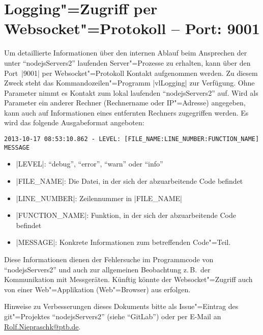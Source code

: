 \documentclass[%
fontsize=11pt
,paper=a4
,twoside
,headings=normal
,numbers=endperiod
,pagesize
]{scrartcl}
\begin{document}
\section{Logging"=Zugriff per Websocket"=Protokoll -- Port: 9001}

Um detaillierte Informationen über den internen Ablauf beim Ansprechen der
unter "`nodejsServers2"' laufenden Server"=Prozesse zu erhalten, kann über
den Port~|9001| per Websocket"=Protokoll Kontakt aufgenommen werden. Zu
diesem Zweck steht das Kommandozeilen"=Programm |vlLogging| zur Verfügung.
Ohne Parameter nimmt es Kontakt zum lokal laufenden "`nodejsServers2"' auf.
Wird als Parameter ein anderer Rechner (Rechnername oder IP"=Adresse)
angegeben, kann auch auf Informationen eines entfernten Rechners zugegriffen
werden. Es wird das folgende Ausgabeformat angeboten:
\begin{lstlisting}[language={}]
2013-10-17 08:53:10.862 - LEVEL: [FILE_NAME:LINE_NUMBER:FUNCTION_NAME] MESSAGE
\end{lstlisting}
\begin{itemize}
  \item |LEVEL|: "`debug"', "`error"', "`warn"' oder "`info"'
  \item |FILE_NAME|: Die Datei, in der sich der abzuarbeitende Code befindet
  \item |LINE_NUMBER|: Zeilennummer in |FILE_NAME|
  \item |FUNCTION_NAME|: Funktion, in der sich der abzuarbeitende Code befindet
  \item |MESSAGE|: Konkrete Informationen zum betreffenden Code"=Teil.
\end{itemize}
Diese Informationen dienen der Fehlersuche im Programmcode von
"`nodejsServers2"' und auch zur allgemeinen Beobachtung z.\,B.\ der
Kommunikation mit Messgeräten. Künftig könnte der Websocket"=Zugriff auch von
einer Web"=Applikation (Web"=Browser) aus erfolgen.

\vfill

\begingroup \small \itshape

\noindent Hinweise zu Verbesserungen dieses Dokuments bitte als
Issue"=Eintrag des git"=Projektes "`nodejsServers2"' (siehe "`GitLab"') oder per
E-Mail an \url{Rolf.Niepraschk@ptb.de}.

\endgroup
\end{document}
